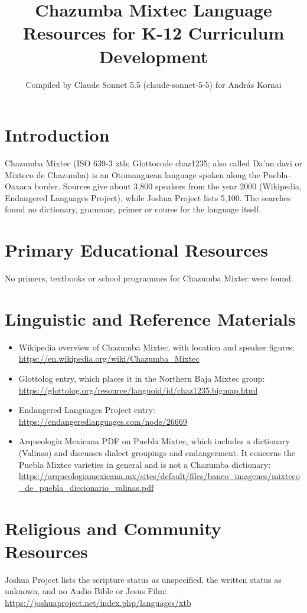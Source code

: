 \documentclass[12pt]{article}
\title{Chazumba Mixtec Language Resources for K-12 Curriculum Development}
\author{Compiled by Claude Sonnet 5.5 (claude-sonnet-5-5) for Andr\'as Kornai}
\date{}
\begin{document}
\maketitle

\section{Introduction}
Chazumba Mixtec (ISO 639-3 xtb; Glottocode chaz1235; also called Da'an davi or Mixteco de Chazumba) is an Otomanguean language spoken along the Puebla--Oaxaca border. Sources give about 3,800 speakers from the year 2000 (Wikipedia, Endangered Languages Project), while Joshua Project lists 5,100. The searches found no dictionary, grammar, primer or course for the language itself.

\section{Primary Educational Resources}
No primers, textbooks or school programmes for Chazumba Mixtec were found.

\section{Linguistic and Reference Materials}
\begin{itemize}
\item Wikipedia overview of Chazumba Mixtec, with location and speaker figures: \url{https://en.wikipedia.org/wiki/Chazumba_Mixtec}
\item Glottolog entry, which places it in the Northern Baja Mixtec group: \url{https://glottolog.org/resource/languoid/id/chaz1235.bigmap.html}
\item Endangered Languages Project entry: \url{https://endangeredlanguages.com/node/26669}
\item Arqueolog\'ia Mexicana PDF on Puebla Mixtec, which includes a dictionary (Valinas) and discusses dialect groupings and endangerment. It concerns the Puebla Mixtec varieties in general and is not a Chazumba dictionary: \url{https://arqueologiamexicana.mx/sites/default/files/banco_imagenes/mixteco_de_puebla_diccionario_valinas.pdf}
\end{itemize}

\section{Religious and Community Resources}
Joshua Project lists the scripture status as unspecified, the written status as unknown, and no Audio Bible or Jesus Film: \url{https://joshuaproject.net/index.php/languages/xtb}
\end{document}
